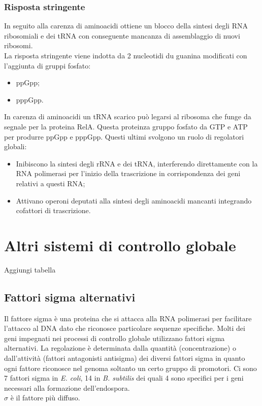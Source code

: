 \subsubsection{Risposta stringente}
In seguito alla carenza di aminoacidi ottiene un blocco della sintesi degli RNA ribosomiali e dei tRNA con conseguente mancanza di assemblaggio di nuovi ribosomi. 
\\La risposta stringente viene indotta da 2 nucleotidi du guanina modificati con l'aggiunta di gruppi fosfato: 
\begin{itemize}
    \item ppGpp; 
    \item pppGpp.
\end{itemize}
In carenza di aminoacidi un tRNA scarico può legarsi al ribosoma che funge da segnale per la proteina RelA. Questa proteinza gruppo fosfato da GTP e ATP per produrre ppGpp e pppGpp. Questi ultimi svolgono un ruolo di regolatori globali: 
\begin{itemize}
    \item Inibiscono la sintesi degli rRNA e dei tRNA, interferendo direttamente con la RNA polimerasi per l'inizio della trascrizione in corrispondenza dei geni relativi a questi RNA;
    \item Attivano operoni deputati alla sintesi degli aminoacidi mancanti integrando cofattori di trascrizione. 
\end{itemize}
\section{Altri sistemi di controllo globale}
Aggiungi tabella
\subsection{Fattori sigma alternativi}
Il fattore sigma è una proteina che si attacca alla RNA polimerasi per facilitare l'attacco al DNA dato che riconosce particolare sequenze specifiche. Molti dei geni impegnati nei processi di controllo globale utilizzano fattori sigma alternativi. La regolazione è determinata dalla quantità (concentrazione) o dall'attività (fattori antagonisti antisigma) dei diversi fattori sigma in quanto ogni fattore riconosce nel genoma soltanto un certo gruppo di promotori. Ci sono 7 fattori sigma in \textit{E. coli}, 14 in \textit{B. subtilis} dei quali 4 sono specifici per i geni necessari alla formazione dell'endospora. 
\\$\sigma$ è  il fattore più diffuso. 
